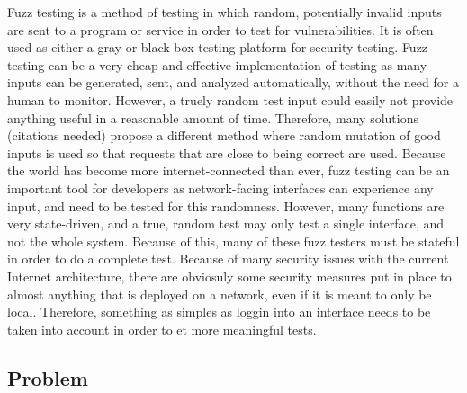 \documentclass[letterpaper,twocolumn,10pt]{article}
\begin{document}
Fuzz testing is a method of testing in which random, potentially invalid inputs are sent to a program or service in order to test for vulnerabilities. It is often used as either a gray or black-box testing platform for security testing. Fuzz testing can be a very cheap and effective implementation of testing as many inputs can be generated, sent, and analyzed automatically, without the need for a human to monitor. However, a truely random test input could easily not provide anything useful in a reasonable amount of time. Therefore, many solutions (citations needed) propose a different method where random mutation of good inputs is used so that requests that are close to being correct are used. 
Because the world has become more internet-connected than ever, fuzz testing can be an important tool for developers as network-facing interfaces can experience any input, and need to be tested for this randomness. However, many functions are very state-driven, and a true, random test may only test a single interface, and not the whole system. Because of this, many of these fuzz testers must be stateful in order to do a complete test. Because of many security issues with the current Internet architecture, there are obviosuly some security measures put in place to almost anything that is deployed on a network, even if it is meant to only be local. Therefore, something as simples as loggin into an interface needs to be taken into account in order to et more meaningful tests.

\subsection{Problem}
\end{document}
